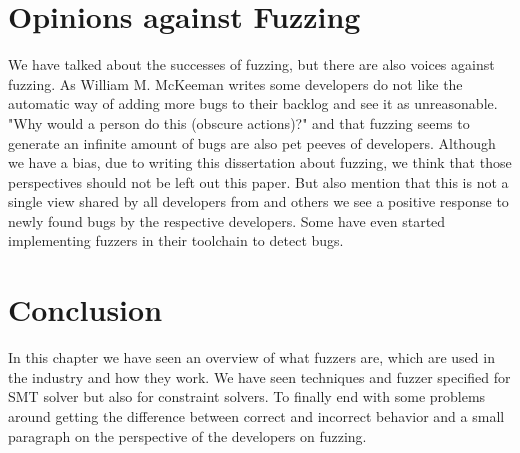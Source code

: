 \section{Opinions against Fuzzing}
\label{fuzzing:OpinionsAgainstFuzzing}
We have talked about the successes of fuzzing, but there are also voices against fuzzing. As William M. McKeeman \cite{39differentialTesting} writes some developers do not like the automatic way of adding more bugs to their backlog and see it as unreasonable. "Why would a person do this (obscure actions)?" and that fuzzing seems to generate an infinite amount of bugs are also pet peeves of developers. 
Although we have a bias, due to writing this dissertation about fuzzing, we think that those perspectives should not be left out this paper. But also mention that this is not a single view shared by all developers from \cite{43YinYang, 42FalconFuzzingConfigurationSettingsAndNormal, 47zhang2019finding} and others we see a positive response to newly found bugs by the respective developers. Some have even started implementing fuzzers \cite{44Stringfuzz} in their toolchain to detect bugs.

\section{Conclusion}
\label{fuzzing:conclusion}
In this chapter we have seen an overview of what fuzzers are, which are used in the industry and how they work. We have seen techniques and fuzzer specified for SMT solver but also for constraint solvers. To finally end with some problems around getting the difference between correct and incorrect behavior and a small paragraph on the perspective of the developers on fuzzing.

